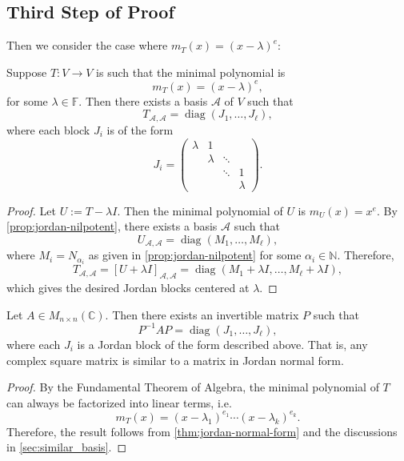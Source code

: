\subsection{Third Step of Proof}
Then we consider the case where \({m}_{T}\left( x\right)  = {\left( x - \lambda \right) }^{e}\):
\begin{corollary}
Suppose \( T : V \to V \) is such that the minimal polynomial is
\[
m_T(x) = (x - \lambda)^e,
\]
for some \( \lambda \in \mathbb{F} \). Then there exists a basis \( \mathcal{A} \) of \( V \) such that
\[
T_{\mathcal{A}, \mathcal{A}} = \operatorname{diag}(J_1, \ldots, J_\ell),
\]
where each block \( J_i \) is of the form
\[
J_i = \begin{pmatrix}
\lambda & 1       &        &        \\
        & \lambda & \ddots &        \\
        &         & \ddots & 1      \\
        &         &        & \lambda
\end{pmatrix}.
\]
\end{corollary}

\begin{proof}
Let \( U := T - \lambda I \). Then the minimal polynomial of \( U \) is \( m_U(x) = x^e \). By \autoref{prop:jordan-nilpotent}, there exists a basis \( \mathcal{A} \) such that
\[
U_{\mathcal{A}, \mathcal{A}} = \operatorname{diag}(M_1, \ldots, M_\ell),
\]
where $M_i = N_{\alpha_i}$ as given in \autoref{prop:jordan-nilpotent} for some $\alpha_i \in \mathbb{N}$.  Therefore,
\[
T_{\mathcal{A}, \mathcal{A}} = [U + \lambda I]_{\mathcal{A}, \mathcal{A}} = \operatorname{diag}(M_1 + \lambda I, \ldots, M_\ell + \lambda I),
\]
which gives the desired Jordan blocks centered at \( \lambda \).
\end{proof}

\begin{corollary}
\label{cor:jordan-c-complete}
Let \( A \in M_{n \times n}(\mathbb{C}) \). Then there exists an invertible matrix \( P \) such that
\[
P^{-1} A P = \operatorname{diag}(J_1, \ldots, J_\ell),
\]
where each \( J_i \) is a Jordan block of the form described above. That is, any complex square matrix is similar to a matrix in Jordan normal form.
\end{corollary}
\begin{proof}
    By the Fundamental Theorem of Algebra, the minimal polynomial of $T$ can always be factorized into linear terms, i.e.
    $$m_{T}(x) = (x-\lambda_1)^{e_1} \cdots (x-\lambda_k)^{e_k}.$$
    Therefore, the result follows from \autoref{thm:jordan-normal-form} and the discussions in \autoref{sec:similar_basis}.
\end{proof}


